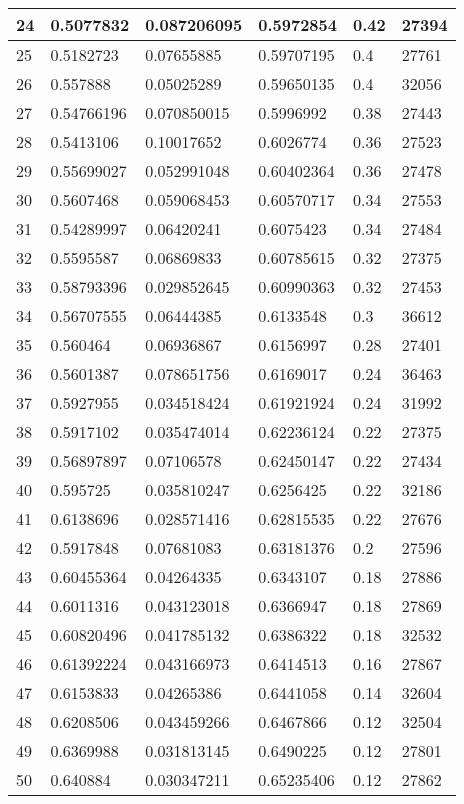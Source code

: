 \begin{longtable}{|l|l|l|l|l|l|}
24 & 0.5077832 & 0.087206095 & 0.5972854 & 0.42 & 27394 \\ \hline 
25 & 0.5182723 & 0.07655885 & 0.59707195 & 0.4 & 27761 \\ \hline 
26 & 0.557888 & 0.05025289 & 0.59650135 & 0.4 & 32056 \\ \hline 
27 & 0.54766196 & 0.070850015 & 0.5996992 & 0.38 & 27443 \\ \hline 
28 & 0.5413106 & 0.10017652 & 0.6026774 & 0.36 & 27523 \\ \hline 
29 & 0.55699027 & 0.052991048 & 0.60402364 & 0.36 & 27478 \\ \hline 
30 & 0.5607468 & 0.059068453 & 0.60570717 & 0.34 & 27553 \\ \hline 
31 & 0.54289997 & 0.06420241 & 0.6075423 & 0.34 & 27484 \\ \hline 
32 & 0.5595587 & 0.06869833 & 0.60785615 & 0.32 & 27375 \\ \hline 
33 & 0.58793396 & 0.029852645 & 0.60990363 & 0.32 & 27453 \\ \hline 
34 & 0.56707555 & 0.06444385 & 0.6133548 & 0.3 & 36612 \\ \hline 
35 & 0.560464 & 0.06936867 & 0.6156997 & 0.28 & 27401 \\ \hline 
36 & 0.5601387 & 0.078651756 & 0.6169017 & 0.24 & 36463 \\ \hline 
37 & 0.5927955 & 0.034518424 & 0.61921924 & 0.24 & 31992 \\ \hline 
38 & 0.5917102 & 0.035474014 & 0.62236124 & 0.22 & 27375 \\ \hline 
39 & 0.56897897 & 0.07106578 & 0.62450147 & 0.22 & 27434 \\ \hline 
40 & 0.595725 & 0.035810247 & 0.6256425 & 0.22 & 32186 \\ \hline 
41 & 0.6138696 & 0.028571416 & 0.62815535 & 0.22 & 27676 \\ \hline 
42 & 0.5917848 & 0.07681083 & 0.63181376 & 0.2 & 27596 \\ \hline 
43 & 0.60455364 & 0.04264335 & 0.6343107 & 0.18 & 27886 \\ \hline 
44 & 0.6011316 & 0.043123018 & 0.6366947 & 0.18 & 27869 \\ \hline 
45 & 0.60820496 & 0.041785132 & 0.6386322 & 0.18 & 32532 \\ \hline 
46 & 0.61392224 & 0.043166973 & 0.6414513 & 0.16 & 27867 \\ \hline 
47 & 0.6153833 & 0.04265386 & 0.6441058 & 0.14 & 32604 \\ \hline 
48 & 0.6208506 & 0.043459266 & 0.6467866 & 0.12 & 32504 \\ \hline 
49 & 0.6369988 & 0.031813145 & 0.6490225 & 0.12 & 27801 \\ \hline 
50 & 0.640884 & 0.030347211 & 0.65235406 & 0.12 & 27862 \\ \hline 
\end{longtable}